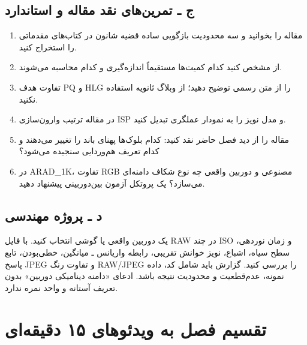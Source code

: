 \subsection*{ج ـ تمرین‌های نقد مقاله و استاندارد}
\begin{enumerate}
\item مقاله  را بخوانید و سه محدودیت بازگویی ساده قضیه شانون
در کتاب‌های مقدماتی را استخراج کنید.
\item از  مشخص کنید کدام کمیت‌ها مستقیماً اندازه‌گیری و کدام محاسبه می‌شوند.
\item تفاوت هدف PQ و HLG را از متن رسمی  توضیح دهید؛ از وبلاگ ثانویه استفاده نکنید.
\item در مقاله  ترتیب وارون‌سازی ISP و مدل نویز را به نمودار عملگری تبدیل کنید.
\item مقاله  را از دید فصل حاضر نقد کنید: کدام بلوک‌ها پهنای باند را تغییر می‌دهند و کدام
تعریف هم‌وردایی سنجیده می‌شود؟
\item در ARAD\_1K، تفاوت RGB مصنوعی و دوربین واقعی چه نوع شکاف دامنه‌ای می‌سازد؟ یک پروتکل آزمون
بین‌دوربینی پیشنهاد دهید.
\end{enumerate}

\subsection*{د ـ پروژه مهندسی}
یک دوربین واقعی یا گوشی انتخاب کنید. با فایل RAW در چند ISO و زمان نوردهی، سطح سیاه، اشباع، نویز
خوانش تقریبی، رابطه واریانس ـ میانگین، خطی‌بودن، تابع پاسخ JPEG و تفاوت رنگ RAW/JPEG را بررسی کنید.
گزارش باید شامل کد، داده نمونه، عدم‌قطعیت و محدودیت نتیجه باشد. ادعای «دامنه دینامیکی دوربین» بدون
تعریف آستانه و واحد نمره ندارد.

\section{تقسیم فصل به ویدئوهای ۱۵ دقیقه‌ای}

